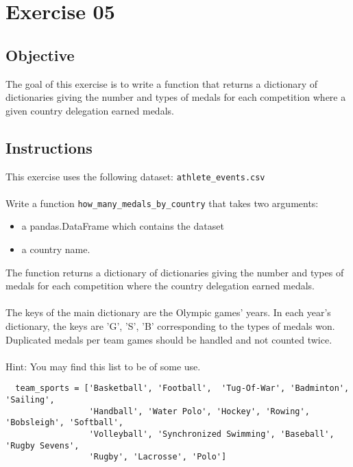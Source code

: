 \chapter{Exercise 05}
\makeheaderfilesforbidden


\section*{Objective}
The goal of this exercise is to write a function that returns a
dictionary of dictionaries giving the number and types of medals for
each competition where a given country delegation earned medals.

\section*{Instructions}
This exercise uses the following dataset: \texttt{athlete\_events.csv}\\
\\
Write a function \texttt{how\_many\_medals\_by\_country} that takes two arguments:
\begin{itemize}
  \item a pandas.DataFrame which contains the dataset  
  \item a country name.
\end{itemize}
The function returns a dictionary of dictionaries giving the number and
types of medals for each competition where the country delegation earned medals.\\
\\
The keys of the main dictionary are the Olympic games' years. In each
year's dictionary, the keys are 'G', 'S', 'B' corresponding to the
types of medals won.
\\
Duplicated medals per team games should be handled and not counted twice.\\
\\
Hint: You may find this list to be of some use.

\begin{verbatim}
  team_sports = ['Basketball', 'Football',  'Tug-Of-War', 'Badminton', 'Sailing',
                 'Handball', 'Water Polo', 'Hockey', 'Rowing', 'Bobsleigh', 'Softball',
                 'Volleyball', 'Synchronized Swimming', 'Baseball', 'Rugby Sevens',
                 'Rugby', 'Lacrosse', 'Polo']
\end{verbatim}


